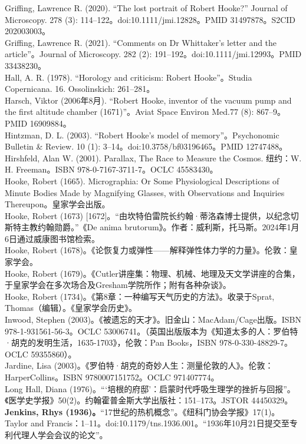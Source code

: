 Griffing, Lawrence R. (2020). “The lost portrait of Robert Hooke?” Journal of Microscopy. 278 (3): 114–122。doi:10.1111/jmi.12828。PMID 31497878。S2CID 202003003。\\
Griffing, Lawrence R. (2021). “Comments on Dr Whittaker's letter and the article”。Journal of Microscopy. 282 (2): 191–192。doi:10.1111/jmi.12993。PMID 33438230。\\
Hall, A. R. (1978). “Horology and criticism: Robert Hooke”。Studia Copernicana. 16. Ossolinskich: 261–281。\\
Harsch, Viktor (2006年8月). “Robert Hooke, inventor of the vacuum pump and the first altitude chamber (1671)”。Aviat Space Environ Med.77 (8): 867–9。PMID 16909884。\\
Hintzman, D. L. (2003). “Robert Hooke's model of memory”。Psychonomic Bulletin & Review. 10 (1): 3–14。doi:10.3758/bf03196465。PMID 12747488。  
Hirshfeld, Alan W. (2001). Parallax, The Race to Measure the Cosmos. 纽约：W. H. Freeman。ISBN 978-0-7167-3711-7。OCLC 45583430。\\
Hooke, Robert (1665). Micrographia: Or Some Physiological Descriptions of Minute Bodies Made by Magnifying Glasses, with Observations and Inquiries Thereupon。皇家学会出版。\\
Hooke, Robert (1673) [1672]。“由坎特伯雷院长约翰·蒂洛森博士提供，以纪念切斯特主教约翰勋爵。”《De anima brutorum》。作者：威利斯，托马斯。2024年1月6日通过威康图书馆检索。\\
Hooke, Robert (1678)。《论恢复力或弹性——解释弹性体力学的力量》。伦敦：皇家学会。\\
Hooke, Robert (1679)。《Cutler讲座集：物理、机械、地理及天文学讲座的合集，于皇家学会在多次场合及Gresham学院所作；附有各种杂谈》。\\
Hooke, Robert (1734)。《第8章：一种编写天气历史的方法》。收录于Sprat, Thomas（编辑）。《皇家学会历史》。\\
Inwood, Stephen (2003)。《被遗忘的天才》。旧金山：MacAdam/Cage出版。ISBN 978-1-931561-56-3。OCLC 53006741。（英国出版版本为《知道太多的人：罗伯特·胡克的发明生活，1635-1703》，伦敦：Pan Books，ISBN 978-0-330-48829-7。OCLC 59355860）。\\
Jardine, Lisa (2003)。《罗伯特·胡克的奇妙人生：测量伦敦的人》。伦敦：HarperCollins。ISBN 9780007151752。OCLC 971407774。\\
Long Hall, Diana (1976)。“‘培根的府邸’：启蒙时代呼吸生理学的挫折与回报”。《医学史学报》50(2)。约翰霍普金斯大学出版社：151–173。JSTOR 44450329。\\
\textbf{Jenkins, Rhys (1936)。}“17世纪的热机概念”。《纽科门协会学报》17(1)。Taylor and Francis：1–11。doi:10.1179/tns.1936.001。“1936年10月21日提交至专利代理人学会会议的论文”。\\
